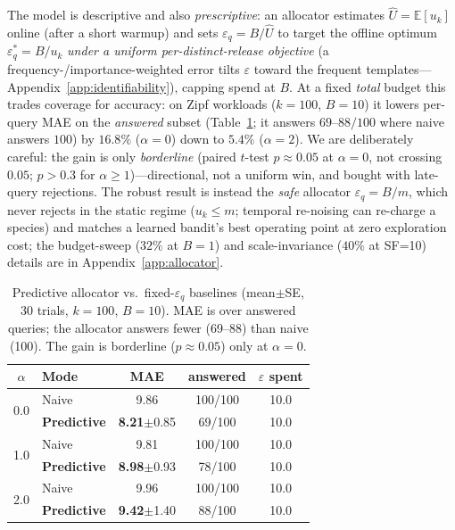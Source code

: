 \documentclass[sigconf,nonacm]{acmart}
\newcommand{\eps}{\varepsilon}
\newcommand{\E}{\mathbb{E}}
\begin{document}
The model is descriptive and also \emph{prescriptive}: an allocator estimates $\hat U=\E[u_k]$ online (after a short warmup) and sets $\eps_q=B/\hat U$ to target the offline optimum $\eps_q^*=B/u_k$ \emph{under a uniform per-distinct-release objective} (a frequency-/importance-weighted error tilts $\eps$ toward the frequent templates---Appendix~\ref{app:identifiability}), capping spend at $B$. At a fixed \emph{total} budget this trades coverage for accuracy: on Zipf workloads ($k{=}100$, $B{=}10$) it lowers per-query MAE on the \emph{answered} subset (Table~\ref{tab:predictive}; it answers $69$--$88/100$ where naive answers $100$) by $16.8\%$ ($\alpha{=}0$) down to $5.4\%$ ($\alpha{=}2$). We are deliberately careful: the gain is only \emph{borderline} (paired $t$-test $p\approx0.05$ at $\alpha{=}0$, not crossing $0.05$; $p>0.3$ for $\alpha\ge1$)---directional, not a uniform win, and bought with late-query rejections. The robust result is instead the \emph{safe} allocator $\eps_q{=}B/m$, which never rejects in the static regime ($u_k\le m$; temporal re-noising can re-charge a species) and matches a learned bandit's best operating point at zero exploration cost; the budget-sweep ($32\%$ at $B{=}1$) and scale-invariance ($40\%$ at SF=10) details are in Appendix~\ref{app:allocator}.

\begin{table}[h]
\footnotesize\centering
\caption{Predictive allocator vs.\ fixed-$\eps_q$ baselines (mean$\pm$SE, 30 trials, $k{=}100$, $B{=}10$). MAE is over answered queries; the allocator answers fewer (69--88) than naive (100). The gain is borderline ($p\approx0.05$) only at $\alpha{=}0$.}
\label{tab:predictive}
\begin{tabular}{c|l|ccc}
\toprule
$\alpha$ & Mode & MAE & answered & $\eps$ spent \\
\midrule
\multirow{2}{*}{0.0} & Naive & 9.86 & 100/100 & 10.0 \\
 & \textbf{Predictive} & \textbf{8.21}$\pm$0.85 & 69/100 & 10.0 \\
\midrule
\multirow{2}{*}{1.0} & Naive & 9.81 & 100/100 & 10.0 \\
 & \textbf{Predictive} & \textbf{8.98}$\pm$0.93 & 78/100 & 10.0 \\
\midrule
\multirow{2}{*}{2.0} & Naive & 9.96 & 100/100 & 10.0 \\
 & \textbf{Predictive} & \textbf{9.42}$\pm$1.40 & 88/100 & 10.0 \\
\bottomrule
\end{tabular}
\end{table}
\end{document}
